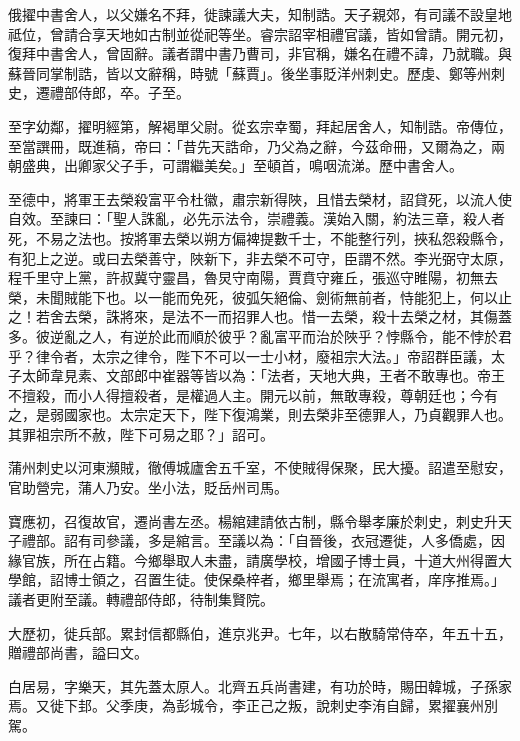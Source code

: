 \begin{pinyinscope}
 俄擢中書舍人，以父嫌名不拜，徙諫議大夫，知制誥。天子親郊，有司議不設皇地祗位，曾請合享天地如古制並從祀等坐。睿宗詔宰相禮官議，皆如曾請。開元初，復拜中書舍人，曾固辭。議者謂中書乃曹司，非官稱，嫌名在禮不諱，乃就職。與蘇晉同掌制誥，皆以文辭稱，時號「蘇賈」。後坐事貶洋州刺史。歷虔、鄭等州刺史，遷禮部侍郎，卒。子至。



 至字幼鄰，擢明經第，解褐單父尉。從玄宗幸蜀，拜起居舍人，知制誥。帝傳位，至當譔冊，既進稿，帝曰：「昔先天誥命，乃父為之辭，今茲命冊，又爾為之，兩朝盛典，出卿家父子手，可謂繼美矣。」至頓首，鳴咽流涕。歷中書舍人。



 至德中，將軍王去榮殺富平令杜徽，肅宗新得陜，且惜去榮材，詔貸死，以流人使自效。至諫曰：「聖人誅亂，必先示法令，崇禮義。漢始入關，約法三章，殺人者死，不易之法也。按將軍去榮以朔方偏裨提數千士，不能整行列，挾私怨殺縣令，有犯上之逆。或曰去榮善守，陜新下，非去榮不可守，臣謂不然。李光弼守太原，程千里守上黨，許叔冀守靈昌，魯炅守南陽，賈賁守雍丘，張巡守睢陽，初無去榮，未聞賊能下也。以一能而免死，彼弧矢絕倫、劍術無前者，恃能犯上，何以止之！若舍去榮，誅將來，是法不一而招罪人也。惜一去榮，殺十去榮之材，其傷蓋多。彼逆亂之人，有逆於此而順於彼乎？亂富平而治於陜乎？悖縣令，能不悖於君乎？律令者，太宗之律令，陛下不可以一士小材，廢祖宗大法。」帝詔群臣議，太子太師韋見素、文部郎中崔器等皆以為：「法者，天地大典，王者不敢專也。帝王不擅殺，而小人得擅殺者，是權過人主。開元以前，無敢專殺，尊朝廷也；今有之，是弱國家也。太宗定天下，陛下復鴻業，則去榮非至德罪人，乃貞觀罪人也。其罪祖宗所不赦，陛下可易之耶？」詔可。



 蒲州刺史以河東瀕賊，徹傅城廬舍五千室，不使賊得保聚，民大擾。詔遣至慰安，官助營完，蒲人乃安。坐小法，貶岳州司馬。



 寶應初，召復故官，遷尚書左丞。楊綰建請依古制，縣令舉孝廉於刺史，刺史升天子禮部。詔有司參議，多是綰言。至議以為：「自晉後，衣冠遷徙，人多僑處，因緣官族，所在占籍。今鄉舉取人未盡，請廣學校，增國子博士員，十道大州得置大學館，詔博士領之，召置生徒。使保桑梓者，鄉里舉焉；在流寓者，庠序推焉。」議者更附至議。轉禮部侍郎，待制集賢院。



 大歷初，徙兵部。累封信都縣伯，進京兆尹。七年，以右散騎常侍卒，年五十五，贈禮部尚書，謚曰文。



 白居易，字樂天，其先蓋太原人。北齊五兵尚書建，有功於時，賜田韓城，子孫家焉。又徙下邽。父季庚，為彭城令，李正己之叛，說刺史李洧自歸，累擢襄州別駕。




\end{pinyinscope}
